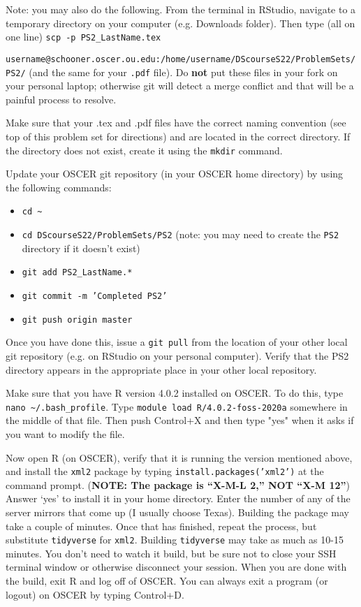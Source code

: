 \documentclass[12pt,english]{exam}
\begin{document}
\begin{questions}
Note: you may also do the following. From the terminal in RStudio, navigate to a temporary directory on your computer (e.g. Downloads folder). Then type (all on one line) \texttt{scp -p PS2\_LastName.tex}\par \texttt{username@schooner.oscer.ou.edu:/home/username/DScourseS22/ProblemSets/PS2/} (and the same for your \texttt{.pdf} file). Do \textbf{not} put these files in your fork on your personal laptop; otherwise git will detect a merge conflict and that will be a painful process to resolve.

\question Make sure that your .tex and .pdf files have the correct naming convention (see top of this problem set for directions) and are located in the correct directory. If the directory does not exist, create it using the \texttt{mkdir} command.

\question Update your OSCER git repository (in your OSCER home directory) by using the following commands:
\begin{itemize}
	\item \texttt{cd \~}
    \item \texttt{cd DScourseS22/ProblemSets/PS2} (note: you may need to create the \texttt{PS2} directory if it doesn't exist)
	\item \texttt{git add PS2\_LastName.*}
	\item \texttt{git commit -m 'Completed PS2'}
	\item \texttt{git push origin master}
\end{itemize}
Once you have done this, issue a \texttt{git pull} from the location of your other local git repository (e.g. on RStudio on your personal computer). Verify that the PS2 directory appears in the appropriate place in your other local repository.

\question Make sure that you have R version 4.0.2 installed on OSCER. To do this, type \texttt{nano \textasciitilde/.bash\_profile}. Type \texttt{module load R/4.0.2-foss-2020a} somewhere in the middle of that file. Then push Control+X and then type "yes" when it asks if you want to modify the file.

\question Now open R (on OSCER), verify that it is running the version mentioned above, and install the \texttt{xml2} package by typing \texttt{install.packages('xml2')} at the command prompt. (\textbf{NOTE: The package is ``X-M-L 2,'' NOT ``X-M 12''}) Answer `yes' to install it in your home directory. Enter the number of any of the server mirrors that come up (I usually choose Texas). Building the package may take a couple of minutes. Once that has finished, repeat the process, but substitute \texttt{tidyverse} for \texttt{xml2}. Building \texttt{tidyverse} may take as much as 10-15 minutes. You don't need to watch it build, but be sure not to close your SSH terminal window or otherwise disconnect your session. When you are done with the build, exit R and log off of OSCER. You can always exit a program (or logout) on OSCER by typing Control+D.


\end{questions}
\end{document}
